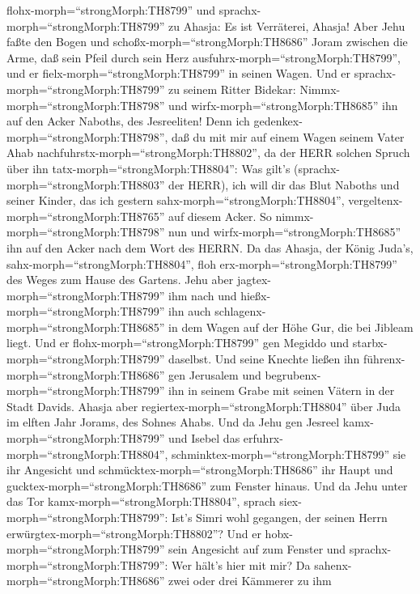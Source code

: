 flohx-morph=``strongMorph:TH8799'' und
sprachx-morph=``strongMorph:TH8799'' zu Ahasja: Es ist Verräterei,
Ahasja!  Aber Jehu faßte den Bogen und
schoßx-morph=``strongMorph:TH8686'' Joram zwischen die Arme, daß sein
Pfeil durch sein Herz ausfuhrx-morph=``strongMorph:TH8799'', und er
fielx-morph=``strongMorph:TH8799'' in seinen Wagen.  Und er
sprachx-morph=``strongMorph:TH8799'' zu seinem Ritter Bidekar:
Nimmx-morph=``strongMorph:TH8798'' und
wirfx-morph=``strongMorph:TH8685'' ihn auf den Acker Naboths, des
Jesreeliten! Denn ich gedenkex-morph=``strongMorph:TH8798'', daß du mit
mir auf einem Wagen seinem Vater Ahab
nachfuhrstx-morph=``strongMorph:TH8802'', da der HERR solchen Spruch
über ihn tatx-morph=``strongMorph:TH8804'':  Was gilt's
(sprachx-morph=``strongMorph:TH8803'' der HERR), ich will dir das Blut
Naboths und seiner Kinder, das ich gestern
sahx-morph=``strongMorph:TH8804'',
vergeltenx-morph=``strongMorph:TH8765'' auf diesem Acker. So
nimmx-morph=``strongMorph:TH8798'' nun und
wirfx-morph=``strongMorph:TH8685'' ihn auf den Acker nach dem Wort des
HERRN.  Da das Ahasja, der König Juda's,
sahx-morph=``strongMorph:TH8804'', floh erx-morph=``strongMorph:TH8799''
des Weges zum Hause des Gartens. Jehu aber
jagtex-morph=``strongMorph:TH8799'' ihm nach und
hießx-morph=``strongMorph:TH8799'' ihn auch
schlagenx-morph=``strongMorph:TH8685'' in dem Wagen auf der Höhe Gur,
die bei Jibleam liegt. Und er flohx-morph=``strongMorph:TH8799'' gen
Megiddo und starbx-morph=``strongMorph:TH8799'' daselbst. 
Und seine Knechte ließen ihn führenx-morph=``strongMorph:TH8686'' gen
Jerusalem und begrubenx-morph=``strongMorph:TH8799'' ihn in seinem Grabe
mit seinen Vätern in der Stadt Davids.  Ahasja aber
regiertex-morph=``strongMorph:TH8804'' über Juda im elften Jahr Jorams,
des Sohnes Ahabs.  Und da Jehu gen Jesreel
kamx-morph=``strongMorph:TH8799'' und Isebel das
erfuhrx-morph=``strongMorph:TH8804'',
schminktex-morph=``strongMorph:TH8799'' sie ihr Angesicht und
schmücktex-morph=``strongMorph:TH8686'' ihr Haupt und
gucktex-morph=``strongMorph:TH8686'' zum Fenster hinaus. 
Und da Jehu unter das Tor kamx-morph=``strongMorph:TH8804'', sprach
siex-morph=``strongMorph:TH8799'': Ist's Simri wohl gegangen, der seinen
Herrn erwürgtex-morph=``strongMorph:TH8802''?  Und er
hobx-morph=``strongMorph:TH8799'' sein Angesicht auf zum Fenster und
sprachx-morph=``strongMorph:TH8799'': Wer hält's hier mit mir? Da
sahenx-morph=``strongMorph:TH8686'' zwei oder drei Kämmerer zu ihm
